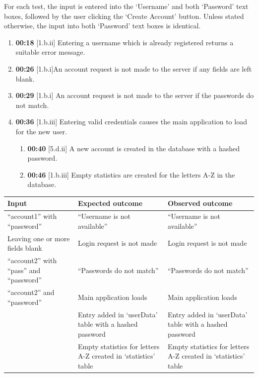 \documentclass{article}
\begin{document}
\begin{enumerate}
    For each test, the input is entered into the `Username' and both `Password' text boxes, followed by the user clicking the `Create Account' button. Unless stated otherwise, the input into both `Password' text boxes is identical.

    \begin{enumerate}
        \item \textbf{00:18} [1.b.ii] Entering a username which is already registered returns a suitable error message.
        \item \textbf{00:26} [1.b.i]An account request is not made to the server if any fields are left blank.
        \item \textbf{00:29} [1.b.i] An account request is not made to the server if the passwords do not match.
        \item \textbf{00:36} [1.b.iii] Entering valid credentials causes the main application to load for the new user.
        \begin{enumerate}
            \item \textbf{00:40} [5.d.ii] A new account is created in the database with a hashed password.
            \item \textbf{00:46} [1.b.iii] Empty statistics are created for the letters A-Z in the database.
        \end{enumerate}
    \end{enumerate}

    \begin{table}[H]
    \centering
        \begin{tabularx}{\textwidth}{|L|L|L|}
        \hline
        \textbf{Input} & \textbf{Expected outcome} & \textbf{Observed outcome} \\\hline
        ``account1'' with ``password'' & ``Username is not available'' & ``Username is not available'' \\\hline
        Leaving one or more fields blank & Login request is not made & Login request is not made \\\hline
        ``account2'' with ``pass'' and ``password'' & ``Passwords do not match'' & ``Passwords do not match'' \\\hline
        ``account2'' and ``password'' & Main application loads & Main application loads \\
        & Entry added in `userData' table with a hashed password & Entry added in `userData' table with a hashed password \\
        & Empty statistics for letters A-Z created in `statistics' table & Empty statistics for letters A-Z created in `statistics' table \\\hline
        \end{tabularx}
    \end{table}


\end{enumerate}
\end{document}
